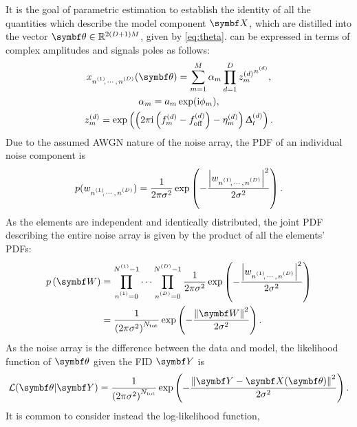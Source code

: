 It is the goal of parametric estimation to establish the
identity of all the quantities which describe the model component $\bX$, which
are distilled into the vector $\bth \in \mathbb{R}^{2(D + 1)M}$, given by
\cref{eq:theta}.
 can be expressed in terms of complex amplitudes and signals poles
as follows:
\begin{subequations}%
    \begin{gather}%
        \xnonenD(\bth) = \sumM \alpha_m \prodD {z^{(d)}_m}^{\nd},\\
        \alpha_m = \amexpphim,\\
        z_m^{(d)} = \exp\left(
            \left(2 \pi \iu \left(f_m^{(d)} - \foffd\right) - \eta^{(d)}_m\right) \Dtd
        \right).%
    \end{gather}%
    \label{eq:x-alpha-z}%
\end{subequations}%
Due to the assumed \ac{AWGN} nature of the noise array, the \acf{PDF} of an
individual noise component is
\begin{equation}
    p(\wnonenD) =
        \frac{1}{2\pi \sigma^2}
        \exp\left( -\frac{\left\lvert \wnonenD \right\rvert^2}{2\sigma^2}\right).
\end{equation}
As the elements are independent and identically distributed, the joint \ac{PDF}
describing the entire noise array is given by the product of all the elements'
\acp{PDF}:
\begin{equation}
    \begin{split}
        p\left(\bW\right) &=
            \prod_{\none=0}^{\None - 1}
            \cdots
            \prod_{\nD=0}^{\ND - 1}
            \frac{1}{2\pi \sigma^2}
            \exp\left(
                -\frac
                {\left\lvert \wnonenD \right\rvert^2}
                {2\sigma^2}\right) \\
            &= \frac{1}{\left(2\pi \sigma^2\right)^{N_{\text{tot}}}}
            \exp\left( -\frac{\left\lVert \bW \right\rVert^2}{2\sigma^2}\right).
    \end{split}
\end{equation}
As the noise array is the difference between the data and model, the
likelihood function of $\bth$ given the \ac{FID} $\bY$ is
\begin{equation}
    \mathcal{L}(\bth \vert \bY) =
    \frac{1}{\left(2\pi \sigma^2\right)^{N_{\text{tot}}}}
        \exp\left( -\frac{\left\lVert \bY - \bX(\bth) \right\rVert^2}{2\sigma^2}\right).
\end{equation}
It is common to consider instead the log-likelihood function,
